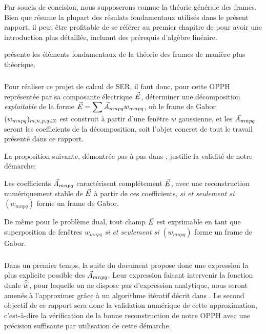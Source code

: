 Par soucis de concision, nous supposerons connue la théorie générale des frames.
Bien que \cite{SlidesLetrou} résume la plupart des résulats fondamentaux utilisés dans le présent rapport,
il peut être profitable de se référer au premier chapitre de \cite{FiniteFrameTheory} pour avoir une introduction
plus détaillée, incluant des prérequis d'algèbre linéaire.

\cite{GaborAlgebra} présente les éléments fondamentaux de la théorie des frames de manière plus théorique.
 
 

\subparagraph{}

  Pour réaliser ce projet de calcul de SER, il faut donc, pour cette OPPH représentée par sa composante électrique ${\vec{E}}$,
  déterminer une décomposition \emph{exploitable} de la forme ${\vec{E}} = \displaystyle\sum{\vec{A}}_{mnpq}w_{mnpq}$,
où le frame de Gabor $(w_{mnpq})_{m,n,p,q\in\mathbb{Z}}$ est construit à partir d'une fenêtre $w$ gaussienne,
et les ${\vec{A}}_{mnpq}$ seront les coefficients de la décomposition, soit l'objet concret de tout le travail
présenté dans ce rapport.

La proposition suivante, démontrée pas à pas dans \cite{TheseLugara}, justifie la validité de notre démarche:

\begin{prop}

  Les coefficients ${\vec{A}}_{mnpq}$ caractérisent complétement ${\vec{E}}$, avec une reconstruction numériquement stable
  de ${\vec{E}}$ à partir de ces coefficients, \emph{si et seulement si} $(w_{mnpq})$ forme un frame de Gabor.  

  De même pour le problème dual, tout champ ${\vec{E}}$ est exprimable en tant que superposition de fenêtres $w_{mnpq}$
 \emph{si et seulement si} $(w_{mnpq})$ forme un frame de Gabor.

 \end{prop}


\subparagraph{}

Dans un premier temps, la suite du document propose donc une expression la plus explicite possible des ${\vec{A}}_{mnpq}$.
Leur expression faisant intervenir la fonction duale $\widehat{\widetilde{w}}$, pour laquelle on ne dispose pas
d'expression analytique, nous seront amenés à l'approximer grâce à un algorithme itératif décrit dans \cite{TheseLugara}.
Le second objectif de ce rapport sera donc la validation numérique de cette approximation, c'est-à-dire la vérification
de la bonne reconstruction de notre OPPH avec une précision suffisante par utilisation de cette démarche.


\newpage